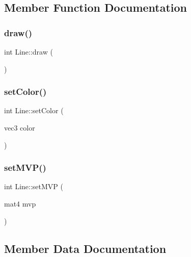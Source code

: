 \subsection{Member Function Documentation}
\mbox{\label{classLine_ac12e023f79f63cf502683e82c47ba9d8}} 
\subsubsection{\texorpdfstring{draw()}{draw()}}
{\footnotesize\ttfamily int Line\+::draw (\begin{DoxyParamCaption}{ }\end{DoxyParamCaption})\hspace{0.3cm}{\ttfamily [inline]}}

\mbox{\label{classLine_ac1cf708f780fe795ac17939dd9aa44e2}} 
\subsubsection{\texorpdfstring{set\+Color()}{setColor()}}
{\footnotesize\ttfamily int Line\+::set\+Color (\begin{DoxyParamCaption}\item[{vec3}]{color }\end{DoxyParamCaption})\hspace{0.3cm}{\ttfamily [inline]}}

\mbox{\label{classLine_a3ccc376f8f6fadaa88d9e6687a179a45}} 
\subsubsection{\texorpdfstring{set\+M\+V\+P()}{setMVP()}}
{\footnotesize\ttfamily int Line\+::set\+M\+VP (\begin{DoxyParamCaption}\item[{mat4}]{mvp }\end{DoxyParamCaption})\hspace{0.3cm}{\ttfamily [inline]}}



\subsection{Member Data Documentation}
\mbox{\label{classLine_aa59cf1049e8a0781bcd410381a1a413d}} 

